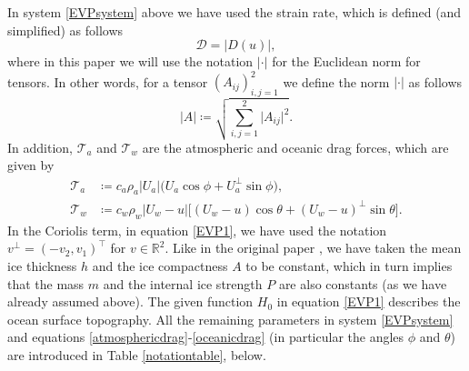 \documentclass[12pt,a4paper]{article}
\theoremstyle{definition}
\theoremstyle{remark}
\numberwithin{equation}{section}
\begin{document}
In system \eqref{EVPsystem} above we have used the strain rate, which is defined (and simplified) as follows
\begin{equation}
\mathcal{D} = \lvert D(u) \rvert,
\end{equation}
where in this paper we will use the notation $\lvert \cdot \rvert$ for the Euclidean norm for tensors. In other words, for a tensor $(A_{ij})_{i,j=1}^2$ we define the norm $\lvert \cdot \rvert$ as follows
\begin{equation*}
\lvert A \rvert \coloneqq \sqrt{\sum_{i,j=1}^2 \lvert A_{ij} \rvert^2}.
\end{equation*}
In addition, $\mathcal{T}_a$ and $\mathcal{T}_w$ are the atmospheric and oceanic drag forces, which are given by
\begin{align}
\mathcal{T}_{a} & \coloneqq c_a \rho_a \lvert U_a \rvert \bigg(U_a \cos \phi + U_a^\perp \sin \phi \bigg), \label{atmosphericdrag} \\
\mathcal{T}_{w} & \coloneqq c_w \rho_w \lvert U_w - u \rvert \bigg[ (U_w - u) \cos \theta + (U_w - u)^\perp \sin \theta \bigg]. \label{oceanicdrag}
\end{align}
In the Coriolis term, in equation \eqref{EVP1}, we have used the notation $v^\perp = (-v_2, v_1)^\top$ for $v \in \mathbb{R}^2$. Like in the original paper \cite{hunke}, we have taken the mean ice thickness $h$ and the ice compactness $A$ to be constant, which in turn implies that the mass $m$ and the internal ice strength $P$ are also constants (as we have already assumed above). The given function $H_0$ in equation \eqref{EVP1} describes the ocean surface topography. All the remaining parameters in system \eqref{EVPsystem} and equations \eqref{atmosphericdrag}-\eqref{oceanicdrag} (in particular the angles $\phi$ and $\theta$) are introduced in Table \ref{notationtable}, below.
\end{document}
